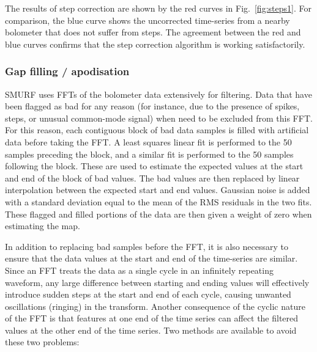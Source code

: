 \documentclass[useAMS,usenatbib,nofootinbib]{mn2e}
\begin{document}
The results of step correction are shown by the red curves in
Fig.~\ref{fig:steps1}. For comparison, the blue curve shows the
uncorrected time-series from a nearby bolometer that does not suffer from
steps. The agreement between the red and blue curves confirms that
the step correction algorithm is working satisfactorily.


\subsubsection{Gap filling / apodisation}
\label{sec:gaps}

SMURF uses FFTs of the bolometer data extensively for filtering. Data
that have been flagged as bad for any reason (for instance, due to the
presence of spikes, steps, or unusual common-mode signal) when need to
be excluded from this FFT. For this reason, each contiguous block of
bad data samples is filled with artificial data before taking the
FFT. A least squares linear fit is performed to the 50 samples
preceding the block, and a similar fit is performed to the 50 samples
following the block. These are used to estimate the expected values at
the start and end of the block of bad values. The bad values are then
replaced by linear interpolation between the expected start and end
values. Gaussian noise is added with a standard deviation equal to the
mean of the RMS residuals in the two fits. These flagged and filled
portions of the data are then given a weight of zero when estimating
the map.

In addition to replacing bad samples before the FFT, it is also
necessary to ensure that the data values at the start and end of the
time-series are similar. Since an FFT treats the data as a single
cycle in an infinitely repeating waveform, any large difference
between starting and ending values will effectively introduce sudden
steps at the start and end of each cycle, causing unwanted
oscillations (ringing) in the transform. Another consequence of the
cyclic nature of the FFT is that features at one end of the time
series can affect the filtered values at the other end of the time
series. Two methods are available to avoid these two problems:
\end{document}
